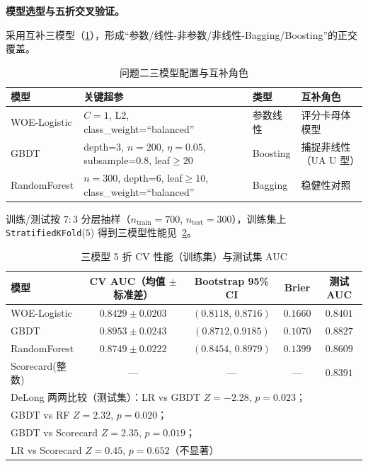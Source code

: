 \documentclass{MathorCupmodeling}
\begin{document}
\noindent\textbf{模型选型与五折交叉验证。}

采用互补三模型（\cref{tab:q2-models}），形成``参数/线性-非参数/非线性-Bagging/Boosting''的正交覆盖\cite{friedman2001,breiman2001}。

\begin{table}[H]
\centering\small
\caption{问题二三模型配置与互补角色}\label{tab:q2-models}
\begin{tabular}{@{}l l l l@{}}
\toprule
模型 & 关键超参 & 类型 & 互补角色 \\
\midrule
WOE-Logistic & $C=1$, L2, class\_weight=``balanced'' & 参数线性 & 评分卡母体模型 \\
GBDT & depth=$3$, $n=200$, $\eta=0.05$, subsample=$0.8$, leaf$\ge20$ & Boosting & 捕捉非线性（UA U 型）\\
RandomForest & $n=300$, depth=$6$, leaf$\ge 10$, class\_weight=``balanced'' & Bagging & 稳健性对照 \\
\bottomrule
\end{tabular}
\end{table}

训练/测试按 $7{:}3$ 分层抽样（$n_{\text{train}}=700$, $n_{\text{test}}=300$），训练集上 \texttt{StratifiedKFold}($5$) 得到三模型性能见~\cref{tab:q2-cv}。

\begin{table}[H]
\centering\small
\caption{三模型 5 折 CV 性能（训练集）与测试集 AUC}\label{tab:q2-cv}
\begin{tabular}{@{}l c c c c@{}}
\toprule
模型 & CV AUC（均值 $\pm$ 标准差）& Bootstrap 95\% CI & Brier & 测试 AUC \\
\midrule
WOE-Logistic & $0.8429 \pm 0.0203$ & $(0.8118,\,0.8716)$ & $0.1660$ & $0.8401$ \\
GBDT & $0.8953 \pm 0.0243$ & $(0.8712,0.9185)$ & $0.1070$ & $0.8827$ \\
RandomForest & $0.8749 \pm 0.0222$ & $(0.8454,\,0.8979)$ & $0.1399$ & $0.8609$ \\
Scorecard(整数) & --- & --- & --- & $0.8391$ \\
\midrule
\multicolumn{5}{l}{DeLong 两两比较（测试集）\cite{delong1988}：LR vs GBDT $Z=-2.28$, $p=0.023$；} \\
\multicolumn{5}{l}{\phantom{DeLong 两两比较（测试集）：}GBDT vs RF $Z=2.32$, $p=0.020$；} \\
\multicolumn{5}{l}{\phantom{DeLong 两两比较（测试集）：}GBDT vs Scorecard $Z=2.35$, $p=0.019$；} \\
\multicolumn{5}{l}{\phantom{DeLong 两两比较（测试集）：}LR vs Scorecard $Z=0.45$, $p=0.652$（不显著）} \\
\bottomrule
\end{tabular}
\end{table}
\end{document}

